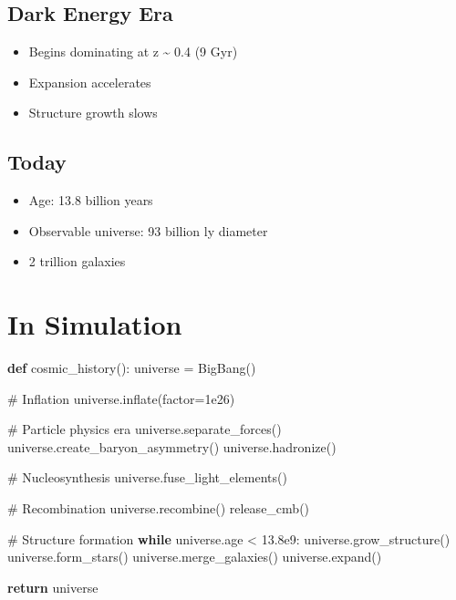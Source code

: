 \documentclass[
  11pt,
  letterpaper,
  twoside,
  openright]{book}
\newenvironment{Shaded}{\begin{snugshade}}{\end{snugshade}}
\newcommand{\CommentTok}[1]{\textcolor[rgb]{0.37,0.37,0.37}{#1}}
\newcommand{\ControlFlowTok}[1]{\textcolor[rgb]{0.00,0.23,0.31}{\textbf{#1}}}
\newcommand{\FloatTok}[1]{\textcolor[rgb]{0.68,0.00,0.00}{#1}}
\newcommand{\KeywordTok}[1]{\textcolor[rgb]{0.00,0.23,0.31}{\textbf{#1}}}
\newcommand{\NormalTok}[1]{\textcolor[rgb]{0.00,0.23,0.31}{#1}}
\newcommand{\OperatorTok}[1]{\textcolor[rgb]{0.37,0.37,0.37}{#1}}
\providecommand{\tightlist}{%
  \setlength{\itemsep}{0pt}\setlength{\parskip}{0pt}}
\begin{document}
\subsection{Dark Energy Era}\label{dark-energy-era}

\begin{itemize}
\tightlist
\item
  Begins dominating at z \textasciitilde{} 0.4 (9 Gyr)
\item
  Expansion accelerates
\item
  Structure growth slows
\end{itemize}

\subsection{Today}\label{today}

\begin{itemize}
\tightlist
\item
  Age: 13.8 billion years
\item
  Observable universe: 93 billion ly diameter
\item
  2 trillion galaxies
\end{itemize}

\section{In Simulation}\label{in-simulation-21}

\begin{Shaded}
\begin{Highlighting}[]
\KeywordTok{def}\NormalTok{ cosmic\_history():}
\NormalTok{    universe }\OperatorTok{=}\NormalTok{ BigBang()}

    \CommentTok{\# Inflation}
\NormalTok{    universe.inflate(factor}\OperatorTok{=}\FloatTok{1e26}\NormalTok{)}

    \CommentTok{\# Particle physics era}
\NormalTok{    universe.separate\_forces()}
\NormalTok{    universe.create\_baryon\_asymmetry()}
\NormalTok{    universe.hadronize()}

    \CommentTok{\# Nucleosynthesis}
\NormalTok{    universe.fuse\_light\_elements()}

    \CommentTok{\# Recombination}
\NormalTok{    universe.recombine()}
\NormalTok{    release\_cmb()}

    \CommentTok{\# Structure formation}
    \ControlFlowTok{while}\NormalTok{ universe.age }\OperatorTok{\textless{}} \FloatTok{13.8e9}\NormalTok{:}
\NormalTok{        universe.grow\_structure()}
\NormalTok{        universe.form\_stars()}
\NormalTok{        universe.merge\_galaxies()}
\NormalTok{        universe.expand()}

    \ControlFlowTok{return}\NormalTok{ universe}
\end{Highlighting}
\end{Shaded}
\end{document}
